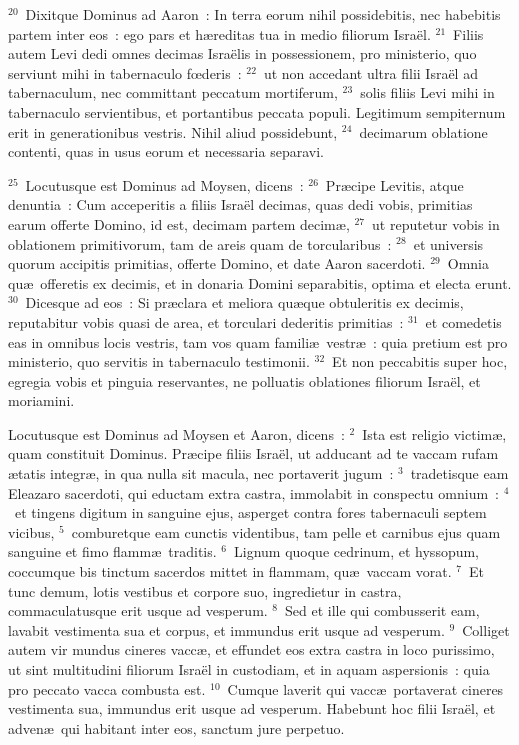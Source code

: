 ${}^{20}$~Dixitque Dominus ad Aaron~: In terra eorum nihil possidebitis, nec habebitis partem inter eos~: ego pars et h\ae reditas tua in medio filiorum Isra\"el.
${}^{21}$~Filiis autem Levi dedi omnes decimas Isra\"elis in possessionem, pro ministerio, quo serviunt mihi in tabernaculo fœderis~:
${}^{22}$~ut non accedant ultra filii Isra\"el ad tabernaculum, nec committant peccatum mortiferum,
${}^{23}$~solis filiis Levi mihi in tabernaculo servientibus, et portantibus peccata populi. Legitimum sempiternum erit in generationibus vestris. Nihil aliud possidebunt,
${}^{24}$~decimarum oblatione contenti, quas in usus eorum et necessaria separavi.


${}^{25}$~Locutusque est Dominus ad Moysen, dicens~:
${}^{26}$~Pr\ae cipe Levitis, atque denuntia~: Cum acceperitis a filiis Isra\"el decimas, quas dedi vobis, primitias earum offerte Domino, id est, decimam partem decim\ae ,
${}^{27}$~ut reputetur vobis in oblationem primitivorum, tam de areis quam de torcularibus~:
${}^{28}$~et universis quorum accipitis primitias, offerte Domino, et date Aaron sacerdoti.
${}^{29}$~Omnia qu\ae\ offeretis ex decimis, et in donaria Domini separabitis, optima et electa erunt.
${}^{30}$~Dicesque ad eos~: Si pr\ae clara et meliora qu\ae que obtuleritis ex decimis, reputabitur vobis quasi de area, et torculari dederitis primitias~:
${}^{31}$~et comedetis eas in omnibus locis vestris, tam vos quam famili\ae\ vestr\ae~: quia pretium est pro ministerio, quo servitis in tabernaculo testimonii.
${}^{32}$~Et non peccabitis super hoc, egregia vobis et pinguia reservantes, ne polluatis oblationes filiorum Isra\"el, et moriamini.

\lettrine[lines=3,image=true,loversize=0.05,lraise=-0.03]{L}{}ocutusque est Dominus ad Moysen et Aaron, dicens~:
${}^{2}$~Ista est religio victim\ae , quam constituit Dominus. Pr\ae cipe filiis Isra\"el, ut adducant ad te vaccam rufam \ae tatis integr\ae , in qua nulla sit macula, nec portaverit jugum~:
${}^{3}$~tradetisque eam Eleazaro sacerdoti, qui eductam extra castra, immolabit in conspectu omnium~:
${}^{4}$~et tingens digitum in sanguine ejus, asperget contra fores tabernaculi septem vicibus,
${}^{5}$~comburetque eam cunctis videntibus, tam pelle et carnibus ejus quam sanguine et fimo flamm\ae\ traditis.
${}^{6}$~Lignum quoque cedrinum, et hyssopum, coccumque bis tinctum sacerdos mittet in flammam, qu\ae\ vaccam vorat.
${}^{7}$~Et tunc demum, lotis vestibus et corpore suo, ingredietur in castra, commaculatusque erit usque ad vesperum.
${}^{8}$~Sed et ille qui combusserit eam, lavabit vestimenta sua et corpus, et immundus erit usque ad vesperum.
${}^{9}$~Colliget autem vir mundus cineres vacc\ae , et effundet eos extra castra in loco purissimo, ut sint multitudini filiorum Isra\"el in custodiam, et in aquam aspersionis~: quia pro peccato vacca combusta est.
${}^{10}$~Cumque laverit qui vacc\ae\ portaverat cineres vestimenta sua, immundus erit usque ad vesperum. Habebunt hoc filii Isra\"el, et adven\ae\ qui habitant inter eos, sanctum jure perpetuo.


